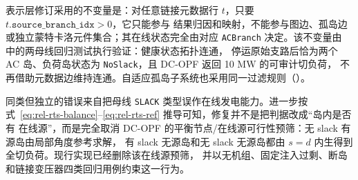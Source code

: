 \begin{boundarynote}
表示层修订采用的不变量是：对任意链接元数据行 $t$，只要 $t.\texttt{source\_branch\_idx}>0$，它只能参与
结果归因和映射，不能参与图边、孤岛边或独立蒙特卡洛元件集合；其在线状态完全由对应
\texttt{ACBranch} 决定。该不变量由
 中的两母线回归测试执行验证：健康状态拓扑连通，
停运原始支路后恰为两个 AC 岛、负荷岛状态为 \texttt{NoSlack}，且 DC-OPF 返回 10 MW 的可审计切负荷，
不再借助元数据边维持连通。自适应孤岛子系统也采用同一过滤规则（）。

同类但独立的错误来自把母线 \texttt{SLACK} 类型误作在线发电能力。进一步按
式~\eqref{eq:rel-rts-balance}--\eqref{eq:rel-rts-ref} 推导可知，修复并不是把判据改成“岛内是否有
在线源”，而是完全取消 DC-OPF 的平衡节点/在线源可行性预筛：无 slack 有源岛由局部角度参考求解，
有 slack 无源岛和无 slack 无源岛都由 $s=d$ 内生得到全切负荷。现行实现已经删除该在线源预筛，
并以无机组、固定注入过剩、断岛和链接变压器四类回归用例约束这一行为。
\end{boundarynote}

